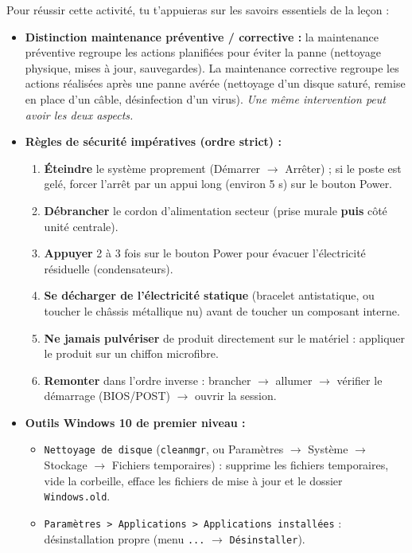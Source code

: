 \documentclass[11pt]{article}
\newcommand{\cle}[1]{{\popxbold\color{popdark}#1}}
\newcounter{popsec}
\newcounter{popsub}
\newcommand{\courssub}[1]{%
  \stepcounter{popsub}%
  \par\vspace{9pt}\noindent{\popxbold\fontsize{11.5}{13}\selectfont\color{popink}{\color{poporange}\thepopsec.\thepopsub}\hspace{6pt}#1}\par\nopagebreak\vspace{4pt}
}
\begin{document}
\courssub{Ressources à mobiliser}
Pour réussir cette activité, tu t'appuieras sur les savoirs essentiels de la leçon :
\begin{itemize}
    \item \textbf{Distinction maintenance préventive / corrective :} la maintenance \cle{préventive} regroupe les actions planifiées pour éviter la panne (nettoyage physique, mises à jour, sauvegardes). La maintenance \cle{corrective} regroupe les actions réalisées après une panne avérée (nettoyage d'un disque saturé, remise en place d'un câble, désinfection d'un virus). \textit{Une même intervention peut avoir les deux aspects.}
    \item \textbf{Règles de sécurité impératives (ordre strict) :}
    \begin{enumerate}
        \item \textbf{Éteindre} le système proprement (Démarrer $\rightarrow$ Arrêter) ; si le poste est gelé, forcer l'arrêt par un appui long (environ 5 s) sur le bouton Power.
        \item \textbf{Débrancher} le cordon d'alimentation secteur (prise murale \textbf{puis} côté unité centrale).
        \item \textbf{Appuyer} 2 à 3 fois sur le bouton Power pour évacuer l'électricité résiduelle (condensateurs).
        \item \textbf{Se décharger de l'électricité statique} (bracelet antistatique, ou toucher le châssis métallique nu) avant de toucher un composant interne.
        \item \textbf{Ne jamais pulvériser} de produit directement sur le matériel : appliquer le produit sur un chiffon microfibre.
        \item \textbf{Remonter} dans l'ordre inverse : brancher $\rightarrow$ allumer $\rightarrow$ vérifier le démarrage (BIOS/POST) $\rightarrow$ ouvrir la session.
    \end{enumerate}
    \item \textbf{Outils Windows 10 de premier niveau :}
    \begin{itemize}
        \item \texttt{Nettoyage de disque} (\texttt{cleanmgr}, ou Paramètres $\rightarrow$ Système $\rightarrow$ Stockage $\rightarrow$ Fichiers temporaires) : supprime les fichiers temporaires, vide la corbeille, efface les fichiers de mise à jour et le dossier \texttt{Windows.old}.
        \item \texttt{Paramètres > Applications > Applications installées} : désinstallation propre (menu \texttt{...} $\rightarrow$ \texttt{Désinstaller}).

\end{itemize}
\end{itemize}
\end{document}
